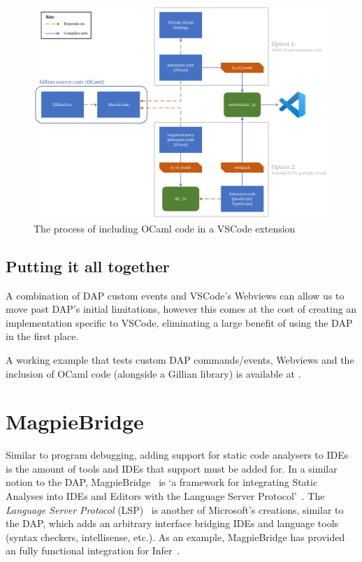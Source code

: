 \begin{figure}
  \center
  \includegraphics[width=650px]{img/vscode-extension-with-ocaml.png}
  \caption{The process of including OCaml code in a VSCode extension}
  \label{fig:vscode-extension-with-ocaml}
\end{figure}

\subsection{Putting it all together}
\label{sec:background:extending-dap}

A combination of DAP custom events and VSCode's Webviews can allow us to move
past DAP's initial limitations, however this comes at the cost of creating an
implementation specific to VSCode, eliminating a large benefit of using the DAP
in the first place.

A working example that tests custom DAP commands/events, Webviews and the
inclusion of OCaml code (alongside a Gillian library) is available at
\cite{debugger-experiment}.

\section{MagpieBridge}

Similar to program debugging, adding support for static code analysers to IDEs
is the amount of tools and IDEs that support must be added for. In a similar
notion to the DAP, MagpieBridge~\cite{magpiebridge} is `a framework for
integrating Static Analyses into IDEs and Editors with the Language Server
Protocol'~\cite{magpiebridge-repo}. The \textit{Language Server Protocol}
(LSP)~\cite{lsp} is another of Microsoft's creations, similar to the DAP, which
adds an arbitrary interface bridging IDEs and language tools (syntax checkers,
intellisense, etc.). As an example, MagpieBridge has provided an fully
functional integration for Infer~\cite{infer-ide}.

